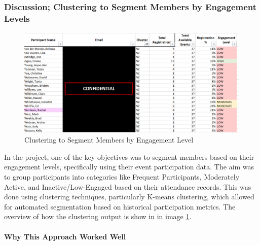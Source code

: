 \documentclass[11pt,a4paper,]{article}
\begin{document}
\subsubsection{Discussion; Clustering to Segment Members by Engagement Levels}\label{discussion-clustering-to-segment-members-by-engagement-levels}

\begin{figure}[H]

{\centering \includegraphics[width=0.9\linewidth]{Images/engagement} 

}

\caption{Clustering to Segment Members by Engagement Level}\label{fig:engagement}
\end{figure}

In the project, one of the key objectives was to segment members based on their engagement levels, specifically using their event participation data. The aim was to group participants into categories like Frequent Participants, Moderately Active, and Inactive/Low-Engaged based on their attendance records. This was done using clustering techniques, particularly K-means clustering, which allowed for automated segmentation based on historical participation metrics. The overview of how the clustering output is show in in image \ref{fig:engagement}.

\paragraph{Why This Approach Worked Well}\label{why-this-approach-worked-well}
\end{document}
